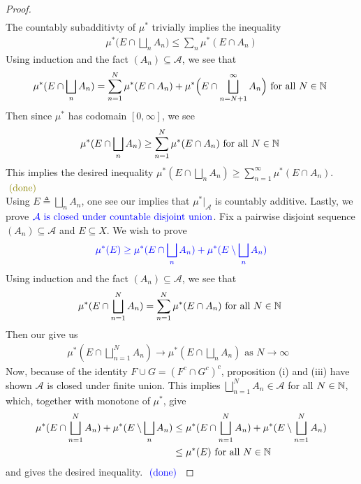 \documentclass{report}
\begin{document}
\begin{proof}
\begin{align*}
\end{align*}
The countably subadditivty of $\mu^*$ trivially implies the inequality  
\begin{align*}
\mu^*\Big(E\cap \bigsqcup_n A_n\Big)\leq \sum_n \mu^*(E\cap A_n)
\end{align*}
Using induction and the fact $(A_n)\subseteq \mathcal{A}$, we see that 
\begin{align*}
\mu^*(E\cap \bigsqcup_n A_n)= \sum_{n=1}^N \mu^*(E\cap A_n) + \mu^*\Big(E\cap \bigsqcup_{n=N+1}^{\infty}A_n \Big)\text{ for all $N \in\mathbb{N}$ }
\end{align*}
Then since $\mu^*$ has codomain $[0,\infty]$, we see 
\begin{align*}
\mu^*(E\cap \bigsqcup_n A_n)\geq \sum_{n=1}^N \mu^*(E\cap A_n)\text{ for all $N \in\mathbb{N}$ }
\end{align*}
This implies the desired inequality $\mu^*(E\cap \bigsqcup_n A_n)\geq \sum_{n=1}^{\infty}\mu^*(E\cap A_n)$. $\odone$\\

Using $E\triangleq \bigsqcup_n A_n$, one see our  implies that $\mu^*|_{\mathcal{A}}$ is countably additive. Lastly, we prove $\textcolor{blue}{\mathcal{A}\text{ is closed under countable disjoint union}}$. Fix a pairwise disjoint sequence $(A_n)\subseteq \mathcal{A}$ and $E\subseteq X$. We wish to prove
\begin{align*}
\textcolor{blue}{\mu^*(E)\geq \mu^*(E\cap \bigsqcup_n A_n)+\mu^*(E\setminus \bigsqcup_n A_n)}
\end{align*}
 Using induction and the fact $(A_n)\subseteq \mathcal{A}$, we see that 
\begin{align*}
\mu^*(E\cap \bigsqcup_{n=1}^N A_n)=\sum_{n=1}^N \mu^*(E\cap A_n)\text{ for all $N\in\mathbb{N}$ }
\end{align*}
Then our  give us 
\begin{align}
\label{mue}
\mu^*(E\cap \bigsqcup_{n=1}^NA_n) \to \mu^*(E\cap \bigsqcup_n A_n)\text{ as $N \to \infty$ }
\end{align}
Now, because of the identity $F\cup G=(F^c\cap G^c)^c$, proposition (i) and (iii) have shown $\mathcal{A}$ is closed under finite union. This implies $\bigsqcup_{n=1}^N A_n\in \mathcal{A}$ for all $N\in\mathbb{N}$, which, together with monotone of $\mu^*$, give 
\begin{align}
  \mu^*(E\cap \bigsqcup_{n=1}^N A_n)+\mu^*(E\setminus \bigsqcup_n A_n)&\leq \mu^*(E\cap \bigsqcup_{n=1}^{N}A_n)+ \mu^*(E\setminus \bigsqcup_{n=1}^N A_n)\notag\\
&\leq \mu^*(E) \text{ for all $N\in\mathbb{N}$ }\label{mue2}
\end{align}
 and  gives the desired inequality. $\textcolor{blue}{\text{ (done) }}$
\end{proof}
\end{document}
